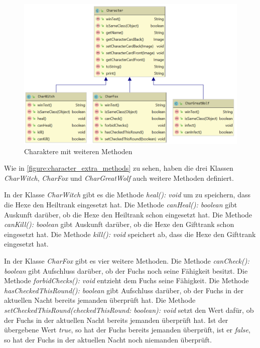 \begin{figure}[H]
	\centering
	\includegraphics[width=13cm]{architektur/character_extra_methods.png}
	\caption{Charaktere mit weiteren Methoden}
	\label{figure:character_extra_methods}
\end{figure} 

Wie in \autoref{figure:character_extra_methods} zu sehen, haben die drei Klassen \textit{CharWitch}, \textit{CharFox} und \textit{CharGreatWolf} auch weitere Methoden definiert. 

\medskip
In der Klasse \textit{CharWitch} gibt es die Methode \textit{heal(): void} um zu speichern, dass die Hexe den Heiltrank eingesetzt hat. Die Methode \textit{canHeal(): boolean} gibt Auskunft darüber, ob die Hexe den Heiltrank schon eingesetzt hat. 
Die Methode \textit{canKill(): boolean} gibt Auskunft darüber, ob die Hexe den Gifttrank schon eingesetzt hat. 
Die Methode \textit{kill(): void} speichert ab, dass die Hexe den Gifttrank eingesetzt hat. 

In der Klasse \textit{CharFox} gibt es vier weitere Methoden. 
Die Methode \textit{canCheck(): boolean} gibt Aufschluss darüber, ob der Fuchs noch seine Fähigkeit besitzt. 
Die Methode \textit{forbidChecks(): void} entzieht dem Fuchs seine Fähigkeit. 
Die Methode \textit{hasCheckedThisRound(): boolean} gibt Aufschluss darüber, ob der Fuchs in der aktuellen Nacht bereits jemanden überprüft hat. 
Die Methode \textit{setCheckedThisRound(checkedThisRound: boolean): void} setzt den Wert dafür, ob der Fuchs in der aktuellen Nacht bereits jemanden überprüft hat. Ist der übergebene Wert \textit{true}, so hat der Fuchs bereits jemanden überprüft, ist er \textit{false}, so hat der Fuchs in der aktuellen Nacht noch niemanden überprüft. 

